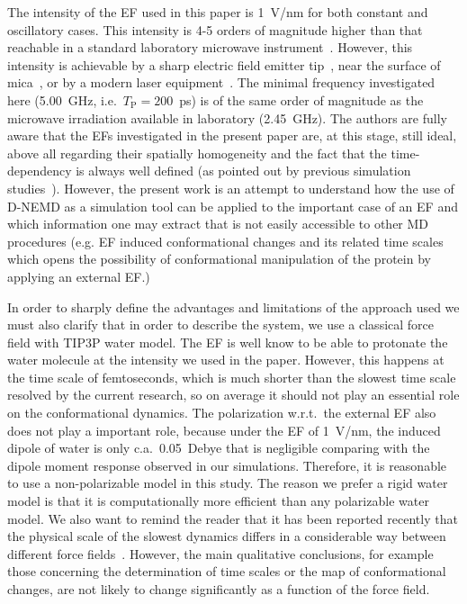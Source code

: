 \documentclass[a4paper,preprint,unsortedaddress,onecolumn]{revtex4-1}
\newcommand{\recheck}[1]{{\color{red} #1}}
\newcommand{\period}[0]{T_{\textrm{P}}}
\begin{document}
The intensity of the EF used in this paper is 1~V/nm for both constant
and oscillatory cases. This intensity is 4-5 orders of magnitude
higher than that reachable in a standard laboratory microwave
instrument~\cite{damm2012can}. However, this intensity is achievable
by a sharp electric field emitter tip~\cite{scovell2000phase}, near
the surface of mica~\cite{starzyk2013proteins}, or by a modern laser
equipment~\cite{vogel2008femtosecond}.
\recheck{The minimal frequency investigated here (5.00~GHz, i.e.~$\period = 200$~ps)
is of the same order of magnitude as the microwave
irradiation available in laboratory (2.45~GHz). }
The authors are fully aware
that the EFs investigated in the present paper are, at this stage, still ideal, above all regarding their spatially homogeneity and
  the fact that the time-dependency is always well defined (as pointed
out by previous simulation studies~\cite{budi2005electric,
  budi2007effect, budi2008comparative, toschi2008effects,
  astrakas2011electric, astrakas2012structural, damm2012can,
  starzyk2013proteins, english2009nonequilibrium,
  solomentsev2012effects}). However, the present work is an attempt to understand how the use of D-NEMD as a simulation tool can be applied to the important case of an EF and which information one may extract that is not easily accessible to other MD procedures (e.g.  EF induced conformational changes and its related time scales which opens the
possibility of conformational manipulation of the protein by applying
an external EF.)

In order to sharply define the advantages and limitations of the approach used we must also clarify that in order to describe the system, we use a classical force field with TIP3P water model.
The EF is well know to be able to protonate the water molecule at the
intensity we used in the paper. However, this happens at the time
scale of femtoseconds, which is much shorter than the slowest time
scale resolved by the current research, so on average it should not play an essential role on the conformational dynamics.
The polarization w.r.t.~the external EF also does
not play a important role, because  under the EF of 1~V/nm, the induced dipole
of water is only c.a.~0.05~Debye that is negligible comparing with the
dipole moment response observed in our simulations.  Therefore, it is
reasonable to use a non-polarizable model in this study.  The reason we
prefer a rigid water model is that it is computationally more
efficient than any polarizable water model.  We also want to remind
the reader that it has been reported recently that the physical scale of the slowest
dynamics differs in a considerable way between different force
fields~\cite{vitalini2013speed}. However, the main qualitative conclusions, for
example those concerning the determination of time scales or the map of conformational changes, 
are not likely to change significantly as a function of the force field.
\end{document}
